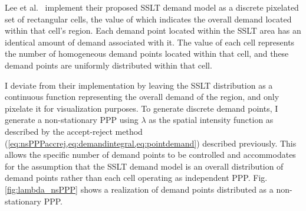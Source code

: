 \documentclass[12pt,dvipsnames]{report}
\begin{document}
Lee et al.~\cite{6554749, 6757900} implement their proposed SSLT demand model as a discrete pixelated set of rectangular cells, the value of which indicates the overall demand located within that cell's region.  Each demand point located within the SSLT area has an identical amount of demand associated with it.  The value of each cell represents the number of homogeneous demand points located within that cell, and these demand points are uniformly distributed within that cell.

I deviate from their implementation by leaving the SSLT distribution as a continuous function representing the overall demand of the region, and only pixelate it for visualization purposes.  To generate discrete demand points, I generate a non-stationary PPP using $\lambda$ as the spatial intensity function as described by the accept-reject method (\cref{eq:nsPPPaccrej,eq:demandintegral,eq:pointdemand}) described previously.  This allows the specific number of demand points to be controlled and accommodates for the assumption that the SSLT demand model is an overall distribution of demand points rather than each cell operating as independent PPP.  Fig. \ref{fig:lambda_nsPPP} shows a realization of demand points distributed as a non-stationary PPP.
\end{document}
